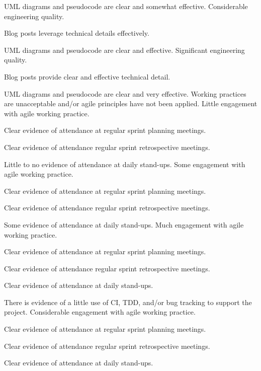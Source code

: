 \documentclass{../../fal_assignment}
\begin{document}
\begin{markingrubric}
            \par UML diagrams and pseudocode are clear and somewhat effective.
        \grade Considerable engineering quality.
            \par Blog posts leverage technical details effectively.
            \par UML diagrams and pseudocode are clear and effective.
        \grade Significant engineering quality.
            \par Blog posts provide clear and effective technical detail.
            \par UML diagrams and pseudocode are clear and very effective.        
%
        \grade\fail Working practices are unacceptable and/or agile principles have not been applied.
        \grade Little engagement with agile working practice.
            \par Clear evidence of attendance at regular sprint planning meetings.
            \par Clear evidence of attendance regular sprint retrospective meetings.
            \par Little to no evidence of attendance at daily stand-ups.
        \grade Some engagement with agile working practice.
            \par Clear evidence of attendance at regular sprint planning meetings.
            \par Clear evidence of attendance regular sprint retrospective meetings.
            \par Some evidence of attendance at daily stand-ups.
        \grade Much engagement with agile working practice.
            \par Clear evidence of attendance at regular sprint planning meetings.
            \par Clear evidence of attendance regular sprint retrospective meetings.
            \par Clear evidence of attendance at daily stand-ups.
            \par There is evidence of a little use of CI, TDD, and/or bug tracking to support the project.
        \grade Considerable engagement with agile working practice.
            \par Clear evidence of attendance at regular sprint planning meetings.
            \par Clear evidence of attendance regular sprint retrospective meetings.
            \par Clear evidence of attendance at daily stand-ups.

\end{markingrubric}
\end{document}
